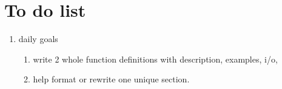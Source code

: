 \documentclass[refman]{article}
\begin{document}
 \section{To do list}
 \begin{enumerate}
 	\item daily goals
 	\begin{enumerate}
 		\item write 2 whole function definitions with description, examples, i/o, 
 		\item help format or rewrite one unique section. 
 	\end{enumerate}
 \end{enumerate}

	
\end{document}
